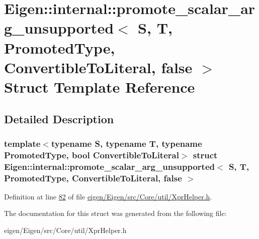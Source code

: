 \hypertarget{struct_eigen_1_1internal_1_1promote__scalar__arg__unsupported_3_01_s_00_01_t_00_01_promoted_type917020263f1acda837ffc1763f00e3e6}{}\section{Eigen\+:\+:internal\+:\+:promote\+\_\+scalar\+\_\+arg\+\_\+unsupported$<$ S, T, Promoted\+Type, Convertible\+To\+Literal, false $>$ Struct Template Reference}
\label{struct_eigen_1_1internal_1_1promote__scalar__arg__unsupported_3_01_s_00_01_t_00_01_promoted_type917020263f1acda837ffc1763f00e3e6}


\subsection{Detailed Description}
\subsubsection*{template$<$typename S, typename T, typename Promoted\+Type, bool Convertible\+To\+Literal$>$\newline
struct Eigen\+::internal\+::promote\+\_\+scalar\+\_\+arg\+\_\+unsupported$<$ S, T, Promoted\+Type, Convertible\+To\+Literal, false $>$}



Definition at line \hyperlink{eigen_2_eigen_2src_2_core_2util_2_xpr_helper_8h_source_l00082}{82} of file \hyperlink{eigen_2_eigen_2src_2_core_2util_2_xpr_helper_8h_source}{eigen/\+Eigen/src/\+Core/util/\+Xpr\+Helper.\+h}.



The documentation for this struct was generated from the following file\+:\begin{DoxyCompactItemize}
\item 
eigen/\+Eigen/src/\+Core/util/\+Xpr\+Helper.\+h\end{DoxyCompactItemize}

